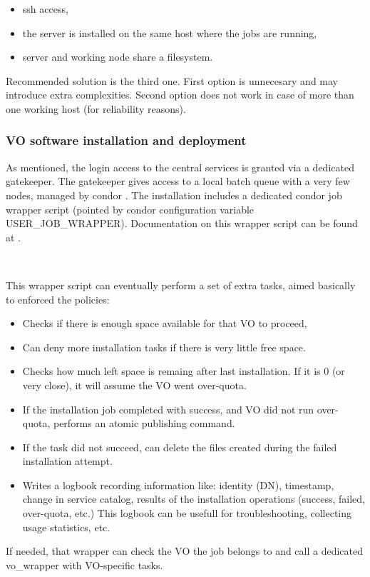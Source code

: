 \documentclass{article}
\begin{document}
\begin{itemize}
    \item ssh access,
    \item the server is installed on the same host where the jobs are running,
    \item server and working node share a filesystem.
\end{itemize}

Recommended solution is the third one. 
First option is unnecesary and may introduce extra complexities.
Second option does not work in case of more than one working host (for reliability reasons).

\subsubsection{VO software installation and deployment}

As mentioned, the login access to the central services is granted via a dedicated gatekeeper.
The gatekeeper gives access to a local batch queue with a very few nodes, managed by condor \cite{condor}.
The installation includes a dedicated condor job wrapper script 
(pointed by condor configuration variable USER\_JOB\_WRAPPER).
Documentation on this wrapper script can be found at \cite{Job wrapper}.

~

This wrapper script can eventually perform a set of extra tasks, 
aimed basically to enforced the policies:
\begin{itemize}
    \item Checks if there is enough space available for that VO to proceed,
    \item Can deny more installation tasks if there is very little free space. 
    \item Checks how much left space is remaing after last installation. 
          If it is 0 (or very close), it will assume the VO went over-quota. 
    \item If the installation job completed with success, and VO did not run over-quota, 
          performs an atomic publishing command. 
    \item If the task did not succeed, can delete the files created during the failed installation attempt.
    \item Writes a logbook recording information like: identity (DN), timestamp, change in service catalog, 
          results of the installation operations (success, failed, over-quota, etc.)
          This logbook can be usefull for troubleshooting, collecting usage statistics, etc.
\end{itemize}
If needed, that wrapper can check the VO the job belongs to and
call a dedicated vo\_wrapper with VO-specific tasks.
\end{document}
